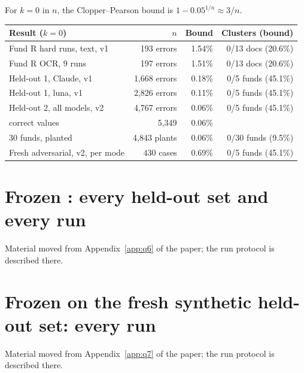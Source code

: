 \label{tab:zero} For $k=0$ in $n$, the Clopper--Pearson bound is $1-0.05^{1/n}\approx 3/n$.
\begin{center}
\begin{tabular}{lrrr}
\toprule
Result ($k=0$) & $n$ & Bound & Clusters (bound) \\
\midrule
Fund R hard runs, text, v1 & 193 errors & 1.54\% & 0/13 docs (20.6\%) \\
Fund R OCR, 9 runs & 197 errors & 1.51\% & 0/13 docs (20.6\%) \\
Held-out 1, Claude, v1 & 1,668 errors & 0.18\% & 0/5 funds (45.1\%) \\
Held-out 1, luna, v1 & 2,826 errors & 0.11\% & 0/5 funds (45.1\%) \\
Held-out 2, all models, v2 & 4,767 errors & 0.06\% & 0/5 funds (45.1\%) \\
\quad correct values & 5,349 & 0.06\% & \\
30 funds, planted & 4,843 plants & 0.06\% & 0/30 funds (9.5\%) \\
Fresh adversarial, v2, per mode & 430 cases & 0.69\% & 0/5 funds (45.1\%) \\
\bottomrule
\end{tabular}
\end{center}

\clearpage
\section{Frozen : every held-out set and every run}\label{sup:q6}
Material moved from Appendix~\ref{app:q6} of the paper; the run protocol is described there.















\clearpage
\section{Frozen  on the fresh synthetic held-out set: every run}\label{sup:q7}
Material moved from Appendix~\ref{app:q7} of the paper; the run protocol is described there.

